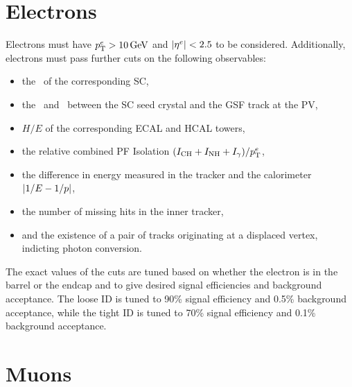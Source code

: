 \section{Electrons}
\label{sec:electrons}

Electrons must have $p_{\mathrm{T}}^{{e}} > 10\,\text{Ge\hspace{-.08em}V}$ and $\lvert \eta^{{e}} \rvert < 2.5$ to be considered.
Additionally, electrons must pass further cuts on the following observables:
\begin{itemize}
  \item the \sieie\ of the corresponding SC,
  \item the \deta\ and \dphi\ between the SC seed crystal and the GSF track at the PV,
  \item $H/E$ of the corresponding ECAL and HCAL towers,
  \item the relative combined PF Isolation $(I_{\text{CH}} + I_{\text{NH}} + I_{\gamma}) / p_{\mathrm{T}}^{{e}}$,
  \item the difference in energy measured in the tracker and the calorimeter $\lvert 1/E - 1/p \rvert$,
  \item the number of missing hits in the inner tracker,
  \item and the existence of a pair of tracks originating at a displaced vertex, indicting photon conversion.
\end{itemize}
The exact values of the cuts are tuned based on whether the electron is in the barrel or the endcap and to give desired signal efficiencies and background acceptance.
The loose ID is tuned to 90\% signal efficiency and 0.5\% background acceptance, while the tight ID is tuned to 70\% signal efficiency and 0.1\% background acceptance.

\section{Muons}
\label{sec:muons}

